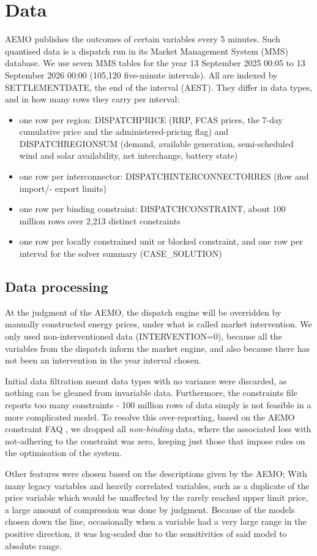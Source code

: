 \chapter{Data}\label{ch:data}

AEMO publishes the outcomes of certain variables every 5 minutes. Such quantised data is a dispatch run in its Market Management System (MMS) database. We use seven MMS tables for the year 13 September 2025 00:05 to 13 September 2026 00:00 (105,120 five-minute intervals). All are indexed by SETTLEMENTDATE, the end of the interval (AEST). They differ in data types, and in how many rows they carry per interval:
\begin{itemize}
    \item one row per region: DISPATCHPRICE (RRP, FCAS prices, the 7-day cumulative price
    and the administered-pricing flag) and DISPATCHREGIONSUM (demand, available
    generation, semi-scheduled wind and solar availability, net interchange, battery state)
    \item one row per interconnector: DISPATCHINTERCONNECTORRES (flow and import/-
    export limits)
    \item one row per binding constraint: DISPATCHCONSTRAINT, about 100 million rows over
    2,213 distinct constraints
    \item one row per locally constrained unit or blocked constraint, and one row per interval for the solver summary (CASE\_SOLUTION)
\end{itemize}

\section{Data processing}\label{sec:dataprocessing}
At the judgment of the AEMO, the dispatch engine will be overridden by manually constructed energy prices, under what is called market intervention. We only used non-interventioned data (INTERVENTION=0), because all the variables from the dispatch inform the market engine, and also because there has not been an intervention in the year interval chosen. 

Initial data filtration meant data types with no variance were discarded, as nothing can be gleaned from invariable data.  Furthermore, the constraints file reports too many constraints - 100 million rows of data simply is not feasible in a more complicated model. To resolve this over-reporting, based on the AEMO constraint FAQ \cite{aemofaq}, we dropped all \emph{non-binding} data, where the associated loss with not-adhering to the constraint was zero, keeping just those that impose rules on the optimisation of the system.  

Other features were chosen based on the descriptions given by the AEMO; With many legacy variables and heavily correlated variables, such as a duplicate of the price variable which would be unaffected by the rarely reached upper limit price, a large amount of compression was done by judgment. Because of the models chosen down the line, occasionally when a variable had a very large range in the positive direction, it was log-scaled due to the sensitivities of said model to absolute range. 